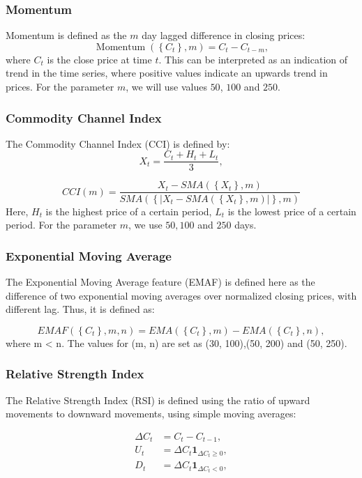 \documentclass[twoside]{report}
\begin{document}
\begin{spacing}{1}
\subsubsection{Momentum}
Momentum is defined as the $m$ day lagged difference in closing prices:
\[
\operatorname{Momentum}\left(\left\{C_{t}\right\}, m\right)=C_{t}-C_{t-m},
\]
where $C_t$ is the close price at time $t$. This can be interpreted as an indication of trend in the time series, where positive values indicate an upwards trend in prices. For the parameter $m$, we will use values $50$, $100$ and $250$.


\subsubsection{Commodity Channel Index}
The Commodity Channel Index (CCI) is defined by:
\[
X_{t}=\frac{C_{t}+H_{t}+L_{t}}{3},
\]

\[
C C I(m)=\frac{X_{t}-S M A\left(\left\{X_{t}\right\}, m\right)}{S M A\left(\left\{\left|X_{t}-S M A\left(\left\{X_{t}\right\}, m\right)\right|\right\}, m\right)}
\]
Here, $H_t$ is the highest price of a certain period, $L_t$ is the lowest price of a certain period.  For the parameter $m$, we use $50, 100$ and $250$ days.

\subsubsection{Exponential Moving Average}
The Exponential Moving Average feature (EMAF) is defined here as the
difference of two exponential moving averages over normalized closing prices,
with different lag. Thus, it is defined as:

\[
E M A F\left(\left\{C_{t}\right\}, m, n\right)=E M A\left(\left\{C_{t}\right\}, m\right)-E M A\left(\left\{C_{t}\right\}, n\right),
\]
where m < n. The values for (m, n) are set as (30, 100),(50, 200) and (50, 250).


\subsubsection{Relative Strength Index}
The Relative Strength Index (RSI) is defined using the ratio of upward movements to downward movements, using simple moving averages:

\[
\begin{aligned}
\Delta C_{t} &=C_{t}-C_{t-1}, \\
U_{t} &=\Delta C_{t} \mathbf{1}_{\Delta C_{t} \geq 0}, \\
D_{t} &=\Delta C_{t} \mathbf{1}_{\Delta C_{t}<0},
\end{aligned}
\]


\end{spacing}
\end{document}
